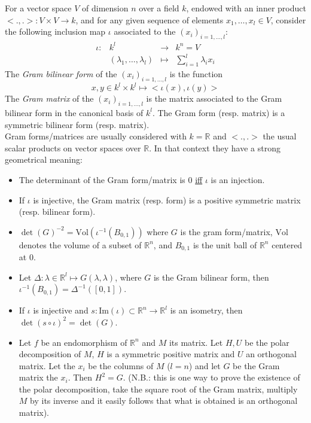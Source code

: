 \documentclass[12pt]{article}
\begin{document}
For a vector space $V$ of dimension $n$ over a field $k$, endowed with an inner product $<.,.>: V\times V\to k$, and for any given sequence of elements $x_1,\ldots,x_l \in V$, consider the following inclusion map $\iota$ associated to the $(x_i)_{i=1,\ldots,l}$:
$$\begin{array}{cccc}
\iota:& k^l & \to & k^n=V\\
      & (\lambda_1,\ldots,\lambda_l)& \mapsto & \sum_{i=1}^l \lambda_i x_i
\end{array}
$$
The \emph{Gram bilinear form} of the $(x_i)_{i=1,\ldots,l}$ is the function
$$x,y\in k^l\times k^l \mapsto <\iota(x),\iota(y)>$$
The \emph{Gram matrix} of the $(x_i)_{i=1,\ldots,l}$ is the matrix associated to the Gram bilinear form in the canonical basis of $k^l$. The Gram form (resp. matrix) is a symmetric bilinear form (resp. matrix).\\

Gram forms/matrices are usually considered with $k=\mathbb R$ and $<.,.>$ the usual scalar products on vector spaces over $\mathbb R$. In that context they have a strong geometrical meaning:
\begin{itemize}
\item The determinant of the Gram form/matrix is $0$ \underline{iff} $\iota$ is an injection.
\item If $\iota$ is injective, the Gram matrix (resp. form) is a positive symmetric matrix (resp. bilinear form).
\item $\det(G)^{-2}=\mathrm{Vol}(\iota^{-1}(B_{0,1}))$ where $G$ is the gram form/matrix, $\mathrm{Vol}$ denotes the volume of a subset of ${\mathbb R}^n$, and $B_{0,1}$ is the unit ball of ${\mathbb R}^n$ centered at $0$.
\item Let $\Delta: \lambda\in {\mathbb R}^l \mapsto G(\lambda,\lambda)$, where $G$ is the Gram bilinear form, then $\iota^{-1}(B_{0,1})=\Delta^{-1}([0,1])$.
\item If $\iota$ is injective and $s:\mathrm{Im}(\iota)\subset{\mathbb R}^n \to {\mathbb R}^l$ is an isometry, then $\det(s\circ\iota)^2=\det(G)$.
\item Let $f$ be an endomorphism of ${\mathbb R}^n$ and $M$ its matrix. Let $H,U$ be the polar decomposition of $M$, $H$ is a symmetric positive matrix and $U$ an orthogonal matrix. Let the $x_i$ be the columns of $M$ ($l=n$) and let $G$ be the Gram matrix the $x_i$. Then $H^2=G$. (N.B.: this is one way to prove the existence of the polar decomposition, take the square root of the Gram matrix, multiply $M$ by its inverse and it easily follows that what is obtained is an orthogonal matrix).
\end{itemize}
\end{document}
